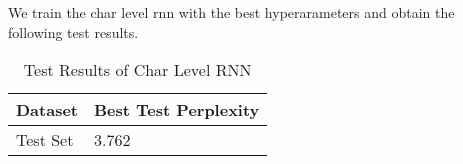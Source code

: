 \documentclass{article}
\begin{document}
We train the char level rnn with the best hyperarameters and obtain the following test results.

\begin{table}[htb]
	\caption{Test Results of Char Level RNN}
	\label{sample-table}
	\centering
	\begin{tabular}{ll}
		\toprule
		\cmidrule{1-2}
		Dataset & Best Test Perplexity\\
		\midrule
		Test Set & 3.762   \\
		\bottomrule
	\end{tabular}
\end{table}
\end{document}
